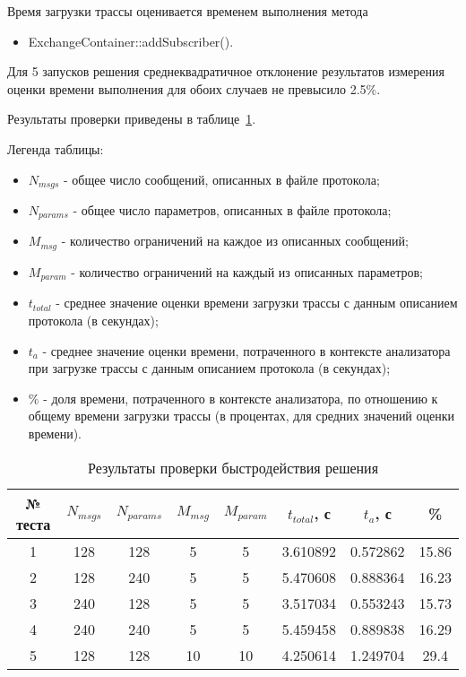 Время загрузки трассы оценивается временем выполнения метода 

\begin{itemize}
 \item ExchangeContainer::addSubscriber().
\end{itemize}

Для 5 запусков решения среднеквадратичное отклонение результатов 
измерения оценки времени выполнения для обоих случаев не превысило 2.5\%.

Результаты проверки приведены в таблице~\ref{tab:prof}.

Легенда таблицы:

\begin{itemize}
 \item $N_{msgs}$ - общее число сообщений, описанных в файле протокола;
 \item $N_{params}$ - общее число параметров, описанных в файле протокола;
 \item $M_{msg}$ - количество ограничений на каждое из описанных сообщений;
 \item $M_{param}$ - количество ограничений на каждый из описанных параметров;
 \item $t_{total}$ - среднее значение оценки времени загрузки трассы с данным 
описанием протокола (в секундах);
 \item $t_{a}$ - среднее значение оценки времени, потраченного в контексте 
анализатора при загрузке трассы с данным описанием протокола (в секундах);
 \item $\%$ - доля времени, потраченного в контексте анализатора, по 
отношению к общему времени загрузки трассы (в процентах, для средних значений 
оценки времени).
\end{itemize}


\begin{table}[H]
 \centering
 \begin{tabular}{|c|*{7}{c|}}
  \hline
  № теста & $N_{msgs}$ & $N_{params}$ & $M_{msg}$ & $M_{param}$ & $t_{total}$, 
с & $t_{a}$, с & \% \\
  \hline
  1 & 128 & 128 & 5   & 5   & 3.610892 & 0.572862 & 15.86 \\
  2 & 128 & 240 & 5   & 5   & 5.470608 & 0.888364 & 16.23 \\
  3 & 240 & 128 & 5   & 5   & 3.517034 & 0.553243 & 15.73 \\
  4 & 240 & 240 & 5   & 5   & 5.459458 & 0.889838 & 16.29 \\
  5 & 128 & 128 & 10 & 10 & 4.250614 & 1.249704 & 29.4 \\
  \hline
 \end{tabular}
 \caption{Результаты проверки быстродействия решения}
 \label{tab:prof}
\end{table}

